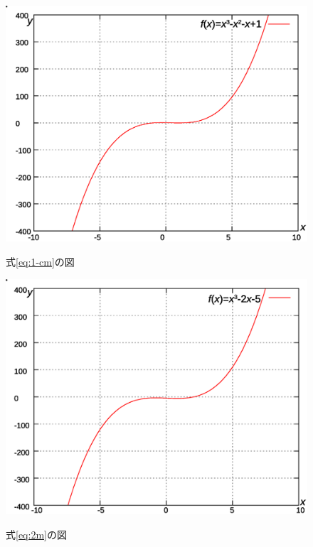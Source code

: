 \documentclass[12pt]{jarticle}
\renewcommand  \[  {\begin{eqnarray}}
\renewcommand  \]  {\end{eqnarray}}
\begin{document}
\begin{figure}[p]
\begin{minipage}{7.95cm}
\includegraphics[scale=0.38]{graph3.eps}
\caption{式\ref{eq:1-cm}の図}
\label{fig:1-cm}
\includegraphics[scale=0.38]{graph4.eps}
\caption{式\ref{eq:2m}の図}
\label{fig:2-m}
\end{minipage}
\end{figure}
\end{document}

